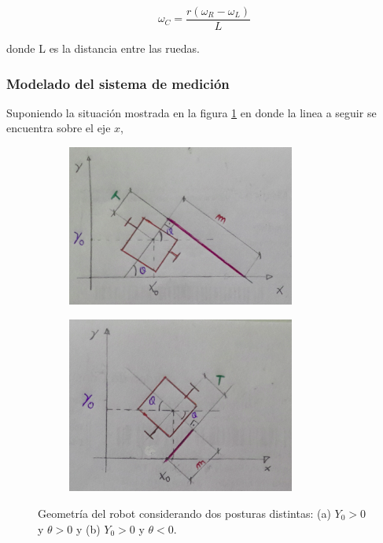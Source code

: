 \documentclass[10pt,conference,a4paper,onecolumn]{article}%
\begin{document}
\begin{equation}
\label{wc}
\omega_{C}=\frac{r(\omega _R - \omega _L) }{L}
\end{equation}

donde L es la distancia entre las ruedas. 

\subsubsection{Modelado del sistema de medición }
\label{sec:modelo_orien}
Suponiendo la situación mostrada en la figura \ref{fig:posturas} en donde la linea a seguir se encuentra sobre el eje $x$, 

\begin{figure}[h]
\centering
    \begin{subfigure}[h]{0.45\textwidth}
    	\centering
        \includegraphics[width=7.5cm]{./imagenes/geometria_A.png}
        \caption{}
    \end{subfigure}
    \quad
    \begin{subfigure}[h]{0.45\textwidth}
    	\centering
        \includegraphics[width=7.5cm]{./imagenes/geometria_B.png}
        \caption{}
    \end{subfigure}
    \caption{Geometría del robot considerando dos posturas distintas: (a) $Y_0 >0 $ y $ \theta >0 $ y (b) $Y_0 >0$ y $ \theta <0$.}
	\label{fig:posturas}
\end{figure}
\end{document}
